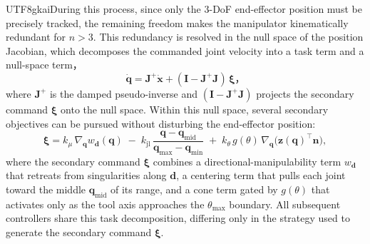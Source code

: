 \documentclass{svproc}
\newcommand{\xinyi}[1]{{\color{darkorange}\begin{CJK*}{UTF8}{gkai}#1\end{CJK*}}}
\begin{document}
\xinyi{During this process, since only the $3$-DoF end-effector position must be precisely tracked, the remaining freedom makes the manipulator kinematically redundant for $n>3$. This redundancy is resolved in the null space of the position Jacobian, which decomposes the commanded joint velocity into a task term and a null-space term，
\begin{equation}
\label{eq:nullspace}
\dot{\mathbf{q}} = \mathbf{J}^{+}\dot{\mathbf{x}} + (\mathbf{I}-\mathbf{J}^{+}\mathbf{J})\,\boldsymbol{\xi}，
\end{equation}
where $\mathbf{J}^{+}$ is the damped pseudo-inverse and $(\mathbf{I}-\mathbf{J}^{+}\mathbf{J})$ projects the secondary command $\boldsymbol{\xi}$ onto the null space. Within this null space, several secondary objectives can be pursued without disturbing the end-effector position:
\begin{equation}
\label{eq:secondary}
\boldsymbol{\xi}=k_{\mu}\,\nabla_{\mathbf{q}}w_{\mathbf{d}}(\mathbf{q})\;-\;k_{\mathrm{jl}}\,\frac{\mathbf{q}-\mathbf{q}_{\mathrm{mid}}}{\mathbf{q}_{\max}-\mathbf{q}_{\min}}\;+\;k_{\theta}\,g(\theta)\,\nabla_{\mathbf{q}}\!\big(\mathbf{z}(\mathbf{q})^{\top}\mathbf{n}\big),
\end{equation}
where the secondary command $\boldsymbol{\xi}$ combines a directional-manipulability term $w_{\mathbf{d}}$ that retreats from singularities along $\mathbf{d}$, a centering term that pulls each joint toward the middle $\mathbf{q}_{\mathrm{mid}}$ of its range, and a cone term gated by $g(\theta)$ that activates only as the tool axis approaches the $\theta_{\max}$ boundary. All subsequent controllers share this task decomposition, differing only in the strategy used to generate the secondary command $\boldsymbol{\xi}$.}
\end{document}
